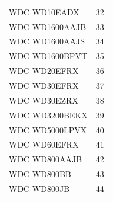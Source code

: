 \documentclass[12pt]{article}
\begin{document}
\begin{table}[H]
\begin{tabular}{lr}
  WDC WD10EADX &  32 \\ 
  WDC WD1600AAJB &  33 \\ 
  WDC WD1600AAJS &  34 \\ 
  WDC WD1600BPVT &  35 \\ 
  WDC WD20EFRX &  36 \\ 
  WDC WD30EFRX &  37 \\ 
  WDC WD30EZRX &  38 \\ 
  WDC WD3200BEKX &  39 \\ 
  WDC WD5000LPVX &  40 \\ 
  WDC WD60EFRX &  41 \\ 
  WDC WD800AAJB &  42 \\ 
  WDC WD800BB &  43 \\ 
  WDC WD800JB &  44 \\ 
   \hline
\end{tabular}
\end{table}
\end{document}
